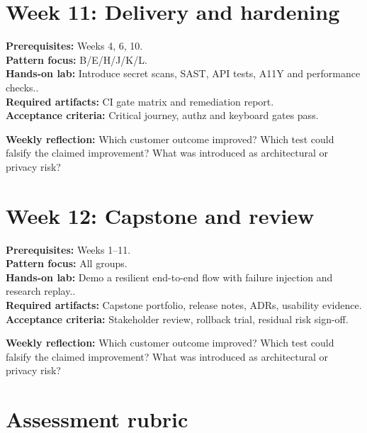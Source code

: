 \documentclass[11pt]{article}
\begin{document}
\section{Week 11: Delivery and hardening}
\textbf{Prerequisites:} Weeks 4, 6, 10.\\
\textbf{Pattern focus:} B/E/H/J/K/L.\\
\textbf{Hands-on lab:} Introduce secret scans, SAST, API tests, A11Y and performance checks..\\
\textbf{Required artifacts:} CI gate matrix and remediation report.\\
\textbf{Acceptance criteria:} Critical journey, authz and keyboard gates pass.
\begin{decisionbox}\textbf{Weekly reflection:} Which customer outcome improved? Which test could falsify the claimed improvement? What was introduced as architectural or privacy risk?\end{decisionbox}
\section{Week 12: Capstone and review}
\textbf{Prerequisites:} Weeks 1--11.\\
\textbf{Pattern focus:} All groups.\\
\textbf{Hands-on lab:} Demo a resilient end-to-end flow with failure injection and research replay..\\
\textbf{Required artifacts:} Capstone portfolio, release notes, ADRs, usability evidence.\\
\textbf{Acceptance criteria:} Stakeholder review, rollback trial, residual risk sign-off.
\begin{decisionbox}\textbf{Weekly reflection:} Which customer outcome improved? Which test could falsify the claimed improvement? What was introduced as architectural or privacy risk?\end{decisionbox}
\section{Assessment rubric}
\end{document}
